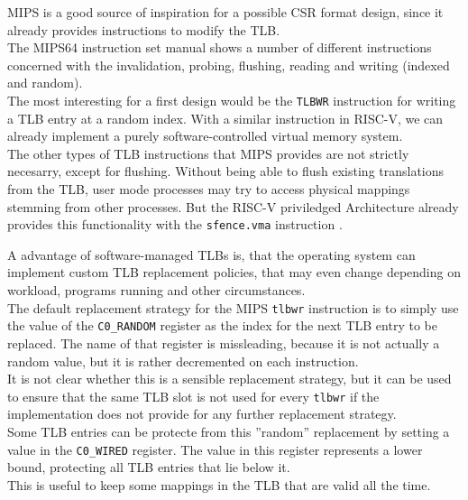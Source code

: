MIPS is a good source of inspiration for a possible CSR format design, since it already provides
instructions to modify the TLB.\\
The MIPS64 instruction set manual \cite{MIPSArchitectureProgrammers2016}
shows a number of different instructions concerned with the invalidation, probing, flushing, reading
and writing (indexed and random).\\
The most interesting for a first design would be the \texttt{TLBWR} instruction for writing a TLB
entry at a random index. With a similar instruction in RISC-V, we can already implement a purely
software-controlled virtual memory system.\\
The other types of TLB instructions that MIPS provides are not strictly necesarry,
except for flushing. Without being able to flush existing translations from the TLB,
user mode processes may try to access physical mappings stemming from other processes.
But the RISC-V priviledged Architecture already provides this functionality
with the \texttt{sfence.vma} instruction \cite{riscvreader}.

A advantage of software-managed TLBs is, that the operating system can implement custom
TLB replacement policies, that may even change depending on workload, programs running
and other circumstances.\\
The default replacement strategy for the MIPS \texttt{tlbwr} instruction is to simply
use the value of the \texttt{C0\_RANDOM} register as the index for the next TLB entry
to be replaced. The name of that register is missleading, because it is not actually a
random value, but it is rather decremented on each instruction\cite{heiserAnatomyHighPerformanceMicrokernel}.\\
It is not clear whether this is a sensible replacement strategy,
but it can be used to ensure that the same TLB slot is not used for every \texttt{tlbwr} if the implementation
does not provide for any further replacement strategy.\\
Some TLB entries can be protecte from this ''random'' replacement by setting a value in the \texttt{C0\_WIRED}
register. The value in this register represents a lower bound, protecting all TLB entries that lie below it.\\
This is useful to keep some mappings in the TLB that are valid all the time.

